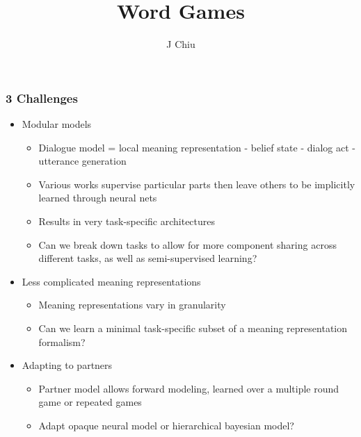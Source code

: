 \documentclass{beamer}
\title{Word Games}
\author{J Chiu}
\begin{document}
\begin{frame}[plain]
\titlepage
\end{frame}

\begin{frame}
\frametitle{3 Challenges}
\begin{itemize}
\item Modular models
    \begin{itemize}
    \item Dialogue model = local meaning representation -
        belief state - dialog act - utterance generation
    \item Various works supervise particular parts
        then leave others to be implicitly learned through
        neural nets
    \item Results in very task-specific architectures
    \item Can we break down tasks to allow for
        more component sharing across different tasks, as well as
        semi-supervised learning?
    \end{itemize}
\item Less complicated meaning representations
    \begin{itemize}
    \item Meaning representations vary in granularity
    \item Can we learn a minimal task-specific subset of a meaning
        representation formalism?
    \end{itemize}
\item Adapting to partners
    \begin{itemize}
    \item Partner model allows forward modeling, learned over
        a multiple round game or repeated games
    \item Adapt opaque neural model or hierarchical bayesian model?
    \end{itemize}
\end{itemize}
\end{frame}
\end{document}
